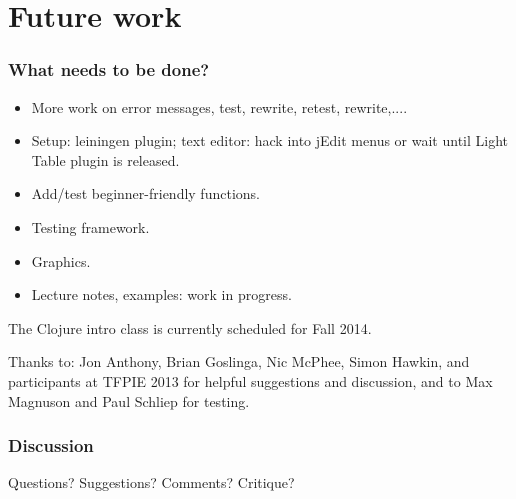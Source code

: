 \documentclass{beamer}
\begin{document}
\section{Future work}

\begin{frame}
  \frametitle{What needs to be done?}
\begin{itemize}
\item More work on error messages, test, rewrite, retest, rewrite,....
\item Setup: leiningen plugin; text editor: hack into jEdit menus or wait until Light Table plugin is released.
\item Add/test beginner-friendly functions. 
\item Testing framework.
\item Graphics. 
\item Lecture notes, examples: work in progress.
\end{itemize}
The Clojure intro class is currently scheduled for Fall 2014. 

\vspace{.05in}

Thanks to: Jon Anthony, Brian Goslinga, Nic McPhee, Simon Hawkin, and participants at TFPIE 2013 for helpful suggestions and discussion, and to Max Magnuson and Paul Schliep for testing. 
\end{frame}



\begin{frame}
  \frametitle{Discussion}
Questions? Suggestions? Comments? Critique? 
\end{frame}
\end{document}
